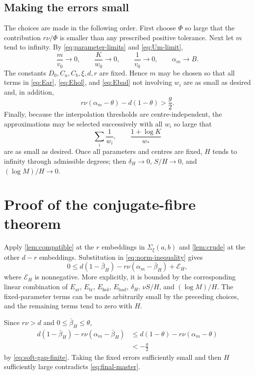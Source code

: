 \documentclass[11pt]{article}
\newcommand{\Comp}{\Sigma_{\xi}(a,b)}
\theoremstyle{definition}
\theoremstyle{remark}
\numberwithin{equation}{section}
\begin{document}
\subsection{Making the errors small}

The choices are made in the following order.  First choose $\Phi$ so
large that the contribution $r\nu/\Phi$ is smaller than any prescribed
positive tolerance.  Next let $m$ tend to infinity.  By
\eqref{eq:parameter-limits} and \eqref{eq:Um-limit},
\[
 \frac{m}{v_0}\to0,
 \qquad \frac K{w_0}\to0,
 \qquad \frac1{v_0}\to0,
 \qquad \alpha_m\to B.
\]
The constants $D_0,C_a,C_b,\xi,d,r$ are fixed.  Hence $m$ may be chosen
so that all terms in \eqref{eq:Ear}, \eqref{eq:Ehol}, and
\eqref{eq:Ebad} not involving $w_i$ are as small as desired and, in
addition,
\begin{equation}\label{eq:soft-gap-finite}
 r\nu(\alpha_m-\theta)-d(1-\theta)>\frac g2.
\end{equation}
Finally, because the interpolation thresholds are centre-independent,
the approximations may be selected successively with all $w_i$ so large
that
\[
 \sum_i\frac1{w_i},
 \qquad
 \frac{1+\log K}{w_*}
\]
are as small as desired.  Once all parameters and centres are fixed,
$H$ tends to infinity through admissible degrees; then
$\delta_H\to0$, $S/H\to0$, and $(\log M)/H\to0$.

\section{Proof of the conjugate-fibre theorem}\label{sec:proof}

Apply \cref{lem:compatible} at the $r$ embeddings in $\Comp$ and
\cref{lem:crude} at the other $d-r$ embeddings.  Substitution in
\eqref{eq:norm-inequality} gives
\begin{equation}\label{eq:final-master}
 0\le
 d(1-\bar\beta_H)-r\nu(\alpha_m-\bar\beta_H)
 +\mathcal E_H,
\end{equation}
where $\mathcal E_H$ is nonnegative.  More explicitly, it is bounded
by the corresponding linear combination of $E_{\mathrm{ar}}$,
$E_{\mathrm{tr}}$, $E_{\mathrm{hol}}$, $E_{\mathrm{bad}}$,
$\delta_H$, $\nu S/H$, and $(\log M)/H$.  The fixed-parameter terms
can be made arbitrarily small by the preceding choices, and the remaining
terms tend to zero with $H$.

Since $r\nu>d$ and $0\le\bar\beta_H\le\theta$,
\begin{align*}
 d(1-\bar\beta_H)-r\nu(\alpha_m-\bar\beta_H)
 &\le d(1-\theta)-r\nu(\alpha_m-\theta)\\
 &<-\frac g2
\end{align*}
by \eqref{eq:soft-gap-finite}.  Taking the fixed errors sufficiently
small and then $H$ sufficiently large contradicts
\eqref{eq:final-master}.
\end{document}
